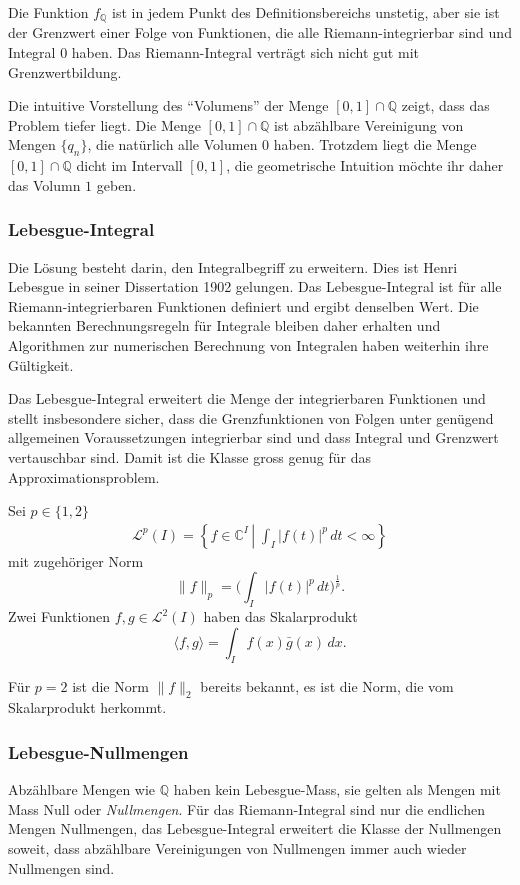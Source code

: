 Die Funktion $f_{\mathbb{Q}}$ ist in jedem Punkt des Definitionsbereichs
unstetig, aber sie ist der Grenzwert einer Folge von Funktionen, die
alle Riemann-integrierbar sind und Integral $0$ haben.
Das Riemann-Integral verträgt sich nicht gut mit Grenzwertbildung.

Die intuitive Vorstellung des ``Volumens'' der Menge 
$[0,1]\cap\mathbb{Q}$ zeigt, dass das Problem tiefer liegt.
Die Menge $[0,1]\cap\mathbb{Q}$ ist abzählbare Vereinigung von Mengen $\{q_n\}$,
die natürlich alle Volumen $0$ haben.
Trotzdem liegt die Menge $[0,1]\cap\mathbb{Q}$ dicht im Intervall $[0,1]$,
die geometrische Intuition möchte ihr daher das Volumn $1$ geben.

\subsubsection{Lebesgue-Integral}
%
%
Die Lösung besteht darin, den Integralbegriff zu erweitern.
Dies ist Henri Lebesgue in seiner Dissertation 1902 gelungen.
Das Lebesgue-Integral ist für alle Riemann-integrierbaren Funktionen
definiert und ergibt denselben Wert.
Die bekannten Berechnungsregeln für Integrale bleiben daher erhalten
und Algorithmen zur numerischen Berechnung von Integralen haben
weiterhin ihre Gültigkeit.

Das Lebesgue-Integral erweitert die Menge der integrierbaren Funktionen
und stellt insbesondere sicher, dass die Grenzfunktionen von Folgen
unter genügend allgemeinen Voraussetzungen integrierbar sind und dass
Integral und Grenzwert vertauschbar sind.
Damit ist die Klasse gross genug für das Approximationsproblem.

\begin{definition}
Sei $p\in \{1,2\}$ 
\begin{align*}
\mathcal{L}^p(I)
=
\left\{ f \in \mathbb C^I \, \left|
\;
\int_I |f(t)|^p\,dt<\infty
\right.\right\}
\end{align*}
mit zugehöriger Norm
\[
\|f\|_p = \biggl(\int_I |f(t)|^p \,dt\biggr)^{\frac1p}.
\]
Zwei Funktionen $f,g\in\mathcal{L}^2(I)$ haben das Skalarprodukt
\[
\langle f,g\rangle
=
\int_I f(x)\bar{g}(x)\,dx.
\]
\end{definition}

Für $p=2$ ist die Norm $\|f\|_2$ bereits bekannt, es ist die Norm, die
vom Skalarprodukt herkommt.

\subsubsection{Lebesgue-Nullmengen}
Abzählbare Mengen wie $\mathbb Q$ haben kein Lebesgue-Mass, sie
gelten als Mengen mit Mass Null oder {\em Nullmengen}.
%
Für das Riemann-Integral sind nur die endlichen Mengen Nullmengen,
das Lebesgue-Integral erweitert die Klasse der Nullmengen soweit,
dass abzählbare Vereinigungen von Nullmengen immer auch wieder
Nullmengen sind.

